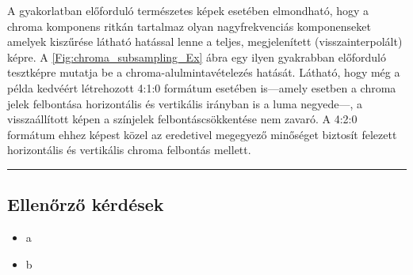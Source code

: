 \vspace{3mm}
A gyakorlatban előforduló természetes képek esetében elmondható, hogy a chroma komponens ritkán tartalmaz olyan nagyfrekvenciás komponenseket amelyek kiszűrése látható hatással lenne a teljes, megjelenített (visszainterpolált) képre.
A \ref{Fig:chroma_subsampling_Ex} ábra egy ilyen gyakrabban előforduló tesztképre mutatja be a chroma-alulmintavételezés hatását.
Látható, hogy még a példa kedvéért létrehozott 4:1:0 formátum esetében is---amely esetben a chroma jelek felbontása horizontális és vertikális irányban is a luma negyede---, a visszaállított képen a színjelek felbontáscsökkentése nem zavaró.
A 4:2:0 formátum ehhez képest közel az eredetivel megegyező minőséget biztosít felezett horizontális és vertikális chroma felbontás mellett.

\vspace{2cm}
\noindent\rule{12cm}{0.4pt}

\subsection*{Ellenőrző kérdések}

\begin{itemize}
\item a
\item b
\end{itemize}